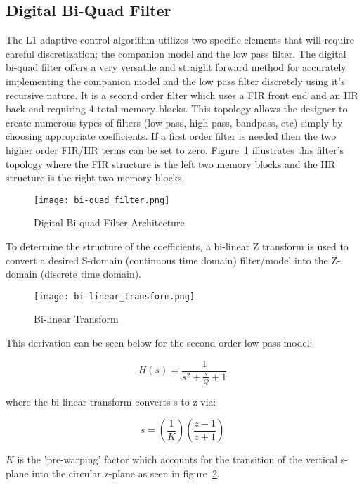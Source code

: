 \subsection{Digital Bi-Quad Filter}

The L1 adaptive control algorithm utilizes two specific elements that will require careful discretization; the companion model and the low pass filter.  The digital bi-quad filter offers a very versatile and straight forward method for accurately implementing the companion model and the low pass filter discretely using it's recursive nature.  It is a second order filter which uses a \ac{FIR} front end and an \ac{IIR} back end requiring 4 total memory blocks.  This topology allows the designer to create numerous types of filters (low pass, high pass, bandpass, etc) simply by choosing appropriate coefficients.  If a first order filter is needed then the two higher order FIR/IIR terms can be set to zero.  Figure~\ref{fig:bi-quad} illustrates this filter's topology where the \ac{FIR} structure is the left two memory blocks and the \ac{IIR} structure is the right two memory blocks.

\begin{figure}[h!]
 \centering
  \texttt{[image: bi-quad\_filter.png]}
  \caption{Digital Bi-quad Filter Architecture }
  \label{fig:bi-quad}
\end{figure}

To determine the structure of the coefficients, a bi-linear Z transform is used to convert a desired S-domain (continuous time domain) filter/model into the Z-domain (discrete time domain).  

\begin{figure}[h!]
 \centering
  \texttt{[image: bi-linear\_transform.png]}
  \caption{Bi-linear Transform }
  \label{fig:bi-linear_transform}
\end{figure}

This derivation can be seen below for the second order low pass model:

\begin{equation}
	H(s) = \frac{1}{s^2+\frac{s}{Q}+1}
\end{equation}

where the bi-linear transform converts s to z via:

\begin{equation}
	s = \left(\frac{1}{K}\right)\left(\frac{z-1}{z+1}\right)
\end{equation}

$K$ is the 'pre-warping' factor which accounts for the transition of the vertical s-plane into the circular z-plane as seen in figure~\ref{fig:bi-linear_transform}.

